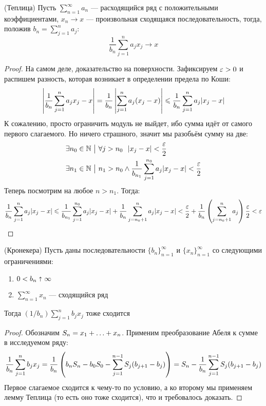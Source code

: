 \begin{lemma} (Теплица)
	Пусть $\sum_{n = 1}^\infty a_n$ --- расходящийся ряд с положительными коэффициентами, $x_n \to x$ --- произвольная сходящаяся последовательность, тогда, положив $b_n = \sum_{j = 1}^n a_j$:
	\[
		\frac{1}{b_n} \sum_{j = 1}^n a_jx_j \to x
	\]
\end{lemma}

\begin{proof}
	На самом деле, доказательство на поверхности. Зафиксируем $\varepsilon > 0$ и распишем разность, которая возникает в определении предела по Коши:
	\[
		\left|\frac{1}{b_n} \sum_{j = 1}^n a_jx_j - x\right| = \frac{1}{b_n} \left|\sum_{j = 1}^n a_j(x_j - x)\right| \leqslant \frac{1}{b_n} \sum_{j = 1}^n a_j|x_j - x|
	\]
	К сожалению, просто ограничить модуль не выйдет, ибо сумма идёт от самого первого слагаемого. Но ничего страшного, значит мы разобьём сумму на две:
	\begin{align*}
		&{\exists n_0 \in \mathbb{N} \ \big|\  \forall j > n_0\ \ |x_j - x| < \frac{\varepsilon}{2}}
		\\
		&{\exists n_1 \in \mathbb{N} \ \big|\  n_1 > n_0 \wedge \frac{1}{b_{n_1}} \sum_{j = 1}^{n_0} a_j|x_j - x|} < \frac{\varepsilon}{2}
	\end{align*}
	Теперь посмотрим на любое $n > n_1$. Тогда:
	\[
		\frac{1}{b_n} \sum_{j = 1}^n a_j|x_j - x| \leqslant \frac{1}{b_{n_1}}\sum_{j = 1}^{n_0} a_j|x_j - x| + \frac{1}{b_n} \sum_{j = n_0 + 1}^n a_j|x_j - x| < \frac{\varepsilon}{2} + \frac{1}{b_n}\left(\sum_{j = n_0 + 1}^n a_j\right) \frac{\varepsilon}{2} < \varepsilon
	\]
\end{proof}

\begin{lemma} (Кронекера)
	Пусть даны последовательности $\{b_n\}_{n = 1}^\infty$ и $\{x_n\}_{n = 1}^\infty$ со следующими ограничениями:
	\begin{enumerate}
		\item $0 < b_n \shortuparrow \infty$
		
		\item $\sum_{n = 1}^\infty x_n$ --- сходящийся ряд
	\end{enumerate}
	Тогда $(1 / b_n)\sum_{j = 1}^n b_jx_j$ тоже сходится
\end{lemma}

\begin{proof}
	Обозначим $S_n = x_1 + \ldots + x_n$. Применим преобразование Абеля к сумме в исследуемом ряду:
	\[
		\frac{1}{b_n}\sum_{j = 1}^n b_jx_j = \frac{1}{b_n}\left(b_nS_n - b_0S_0 - \sum_{j = 1}^{n - 1} S_j(b_{j + 1} - b_j)\right) = S_n - \frac{1}{b_n}\sum_{j = 1}^{n - 1} S_j(b_{j + 1} - b_j)
	\]
	Первое слагаемое сходится к чему-то по условию, а ко второму мы применяем лемму Теплица (то есть оно тоже сходится), что и требовалось доказать.
\end{proof}

